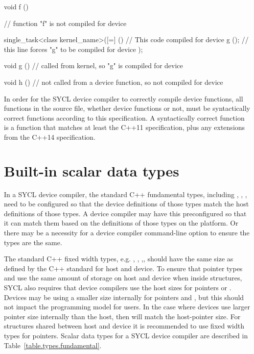 \begin{code}
void f ()
{
    // function "f" is not compiled for device

    single_task<class kernel_name>([=] ()
        {
            // This code compiled for device
            g (); // this line forces "g" to be compiled for device
        });
}

void g ()
{
    // called from kernel, so "g" is compiled for device
}

void h ()
{
    // not called from a device function, so not compiled for device
}
\end{code}

In order for the SYCL device compiler to correctly compile device functions, all
functions in the source file, whether device functions or not, must be
syntactically correct functions according to this specification. A syntactically
correct function is a function that matches at least the C++11 specification,
plus any extensions from the C++14 specification.

\section{Built-in scalar data types}
\label{subsection:scalartypes}
In a SYCL device compiler, the standard C++ fundamental types, including
, , ,
 need to be configured so that the device
definitions of those types match the host definitions of those types. A device
compiler may have this preconfigured so that it can match them based on the
definitions of those types on the platform. Or there may be a necessity for a
device compiler command-line option to ensure the types are the same.

The standard C++ fixed width types, e.g. ,
, ,,
should have the same size as defined by the C++ standard for host and
device.
\ifx\showtodos\true
To ensure that pointer types and  use the same amount of
storage on host and device when inside structures, SYCL also requires that
device compilers use the host sizes for pointers or . Devices
may be using a smaller size internally for pointers and ,
but this should not impact the programming model for users. In the case where
devices use larger pointer size internally than the host, then
 will match the \gls{host-pointer} size. For structures shared
between host and device it is recommended to use fixed width types for pointers.
Scalar data types for a SYCL device compiler are described in
Table~\ref{table.types.fundamental}.
\fi

